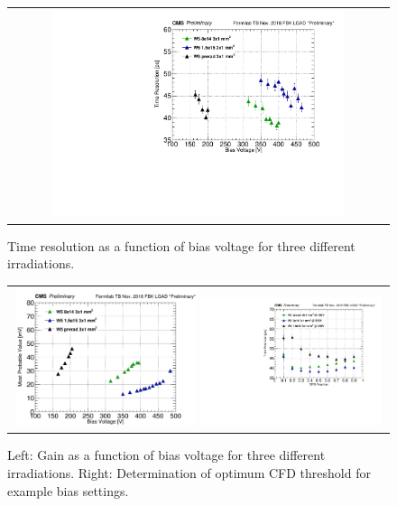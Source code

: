 \documentclass[preprint,1p]{elsarticle}
\begin{document}
\begin{figure}[htp] 
\centering 
\begin{tabular}{c} 
\includegraphics[width=0.79\textwidth]{fig/tP_VScan}  

\end{tabular} 
\caption{Time resolution as a function of bias voltage for three different irradiations.}
\label{fig:tp_VScan} 
\end{figure} 

\begin{figure}[htp] 
\centering 
\begin{tabular}{c} 
\includegraphics[width=0.49\textwidth]{fig/mpv_VScan}  
\includegraphics[width=0.49\textwidth]{fig/cfdScan}  

\end{tabular} 
\caption{Left: Gain as a function of bias voltage for three different irradiations. Right: Determination of optimum CFD threshold for example bias settings.}
\label{fig:gain_cfd_scan} 
\end{figure} 
\end{document}
